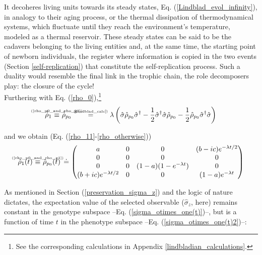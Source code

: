 \documentclass[11pt]{article}
\numberwithin{equation}{section} %
\numberwithin{figure}{section} %
\newcommand\numeq[1] %
  {\stackrel{\scriptscriptstyle(\mkern-1.5mu#1\mkern-1.5mu)}{=}}
\begin{document}
It decoheres living units towards its steady states, Eq.  (\ref{Lindblad_evol_infinity}), in analogy to their aging process, or the thermal dissipation of thermodynamical systems, which fluctuate until they reach the environment's temperature, modeled as a thermal reservoir. These steady states can be said to be the cadavers belonging to the living entities and, at the same time, the starting point of newborn individuals, the register where information is copied in the two events (Section \ref{self-replication}) that constitute the self-replication process. Such a duality would resemble the final link in the trophic chain, the role decomposers play: the closure of the cycle!\\

Furthering with Eq. (\ref{rho_0}),\footnote{See the corresponding calculations in Appendix \ref{lindbladian_calculations}.}
\begin{equation} \label{rho_1_lindblad}
\hat{\dot{\rho}}_{1} \,\,\newcommand\myeq1{\mathrel{\stackrel{\makebox[0pt]{\mbox{\normalfont\tiny \textrm{(\ref{rho_p0_and_rho_g1})}}}}{\equiv}}}\,\,   \hat{\dot{\rho}}_{p_0}\numeq{\textrm{\ref{lindblad_calc}}}\lambda\left(\hat{\sigma}\hat{\rho}_{p_0}\hat{\sigma}^\dagger - \frac{1}{2}\hat{\sigma}^\dagger \hat{\sigma}\hat{\rho}_{p_0}-\frac{1}{2}\hat{\rho}_{p_0}\hat{\sigma}^\dagger\hat{\sigma}\right)
\end{equation}

and we obtain (Eq. (\ref{rho_11}-\ref{rho_otherwise})) $\,\,\,$ \cite[p.~3, Eq.~(4)]{AL_in_QT}
\begin{equation} \label{rho_g1(t)}
\hat{\rho}_{1}(t)  \,\,\newcommand\myeq1{\mathrel{\stackrel{\makebox[0pt]{\mbox{\normalfont\tiny \textrm{(\ref{rho_p0_and_rho_g1})}}}}{\equiv}}}\,\,  \hat{\rho}_{p_0}(t)\,\doteq\begin{pmatrix}a&0&0&(b-ic)e^{-\lambda t/2}\\0&0&0&0 \\ 0&0&(1-a)(1-e^{-\lambda t})&0 \\ (b+ic)e^{-\lambda t/2}&0&0&(1-a)e^{-\lambda t} \end{pmatrix}
\end{equation}

As mentioned in Section (\ref{preservation_sigma_z}) and the logic of nature dictates, the expectation value of the selected observable ($\hat{\sigma}_z$, here) remains constant in the genotype subspace --Eq. (\ref{sigma_otimes_one(t)})--, but is a function of time $t$ in the phenotype subspace --Eq. (\ref{sigma_otimes_one(t)2})--: $\,\,\,$ \cite[p.~3, Eq.~(5)]{AL_in_QT}
\end{document}

